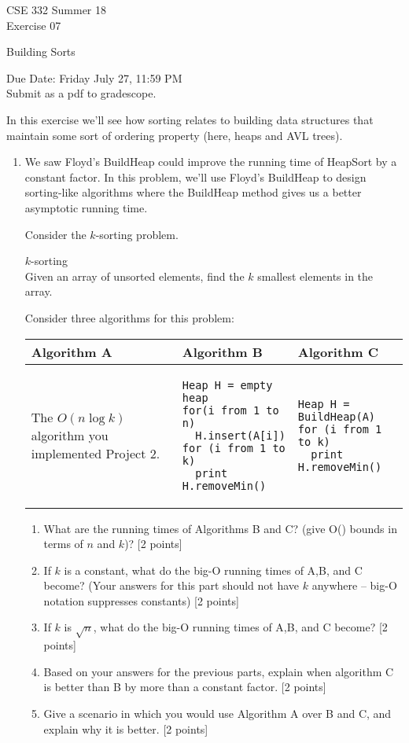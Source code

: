 \documentclass[12pt]{article}
\begin{document}
{\huge CSE 332 Summer 18\\
Exercise 07}


\begin{center}
	{\huge \color{purple} Building Sorts}
\end{center}

Due Date: Friday July 27, 11:59 PM\\
Submit as a pdf to gradescope.

In this exercise we'll see how sorting relates to building data structures that maintain some sort of ordering property (here, heaps and AVL trees).

\begin{enumerate}
\item
We saw Floyd's BuildHeap could improve the running time of HeapSort by a constant factor. In this problem, we'll use Floyd's BuildHeap to design sorting-like algorithms where the BuildHeap method gives us a better asymptotic running time.

Consider the $k$-sorting problem. 
\begin{tcolorbox}
$k$-sorting\\
Given an array of unsorted elements, find the $k$ smallest elements in the array.
\end{tcolorbox}
Consider three algorithms for this problem:

\begin{tabular}{|p{2.1in}|p{2.1in}|p{2.1in}|}
\hline
Algorithm A & Algorithm B & Algorithm C\\
\hline
The $O(n \log k)$ algorithm you implemented Project 2. &
\begin{lstlisting}[aboveskip = -0.7\baselineskip, belowskip = -\baselineskip]
Heap H = empty heap
for(i from 1 to n)
  H.insert(A[i])
for (i from 1 to k)
  print H.removeMin()
\end{lstlisting}
	& 
\begin{lstlisting}[aboveskip = -0.7\baselineskip, belowskip = -\baselineskip]
Heap H = BuildHeap(A)
for (i from 1 to k)
  print H.removeMin()
\end{lstlisting}
	\\ \hline
\end{tabular}

	\begin{enumerate}
		\item What are the running times of Algorithms B and C? (give O() bounds in terms of $n$ and $k$)? [2 points]
		\item If $k$ is a constant, what do the big-O running times of A,B, and C become? (Your answers for this part should not have $k$ anywhere -- big-O notation suppresses constants) [2 points]
		\item If $k$ is $\sqrt{n}$, what do the big-O running times of A,B, and C become? [2 points]
		\item Based on your answers for the previous parts, explain when algorithm C is better than B by more than a constant factor. [2 points]
		\item Give a scenario in which you would use Algorithm A over B and C, and explain why it is better. [2 points]
	\end{enumerate}


\end{enumerate}
\end{document}
